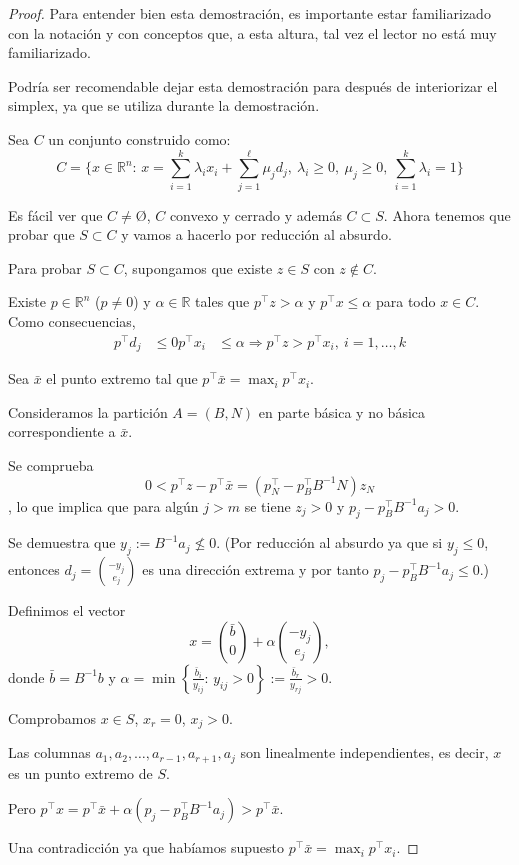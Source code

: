 \begin{proof}
Para entender bien esta demostración, es importante estar familiarizado con la notación y con conceptos que, a esta altura, tal vez el lector no está muy familiarizado. 

Podría ser recomendable dejar esta demostración para después de interiorizar el simplex, ya que se utiliza durante la demostración.


Sea $C$ un conjunto construido como:
\[
C = \{x\in\mathbb{R}^n:\, x = \sum_{i=1}^k \lambda_i x_i + \sum_{j=1}^\ell
 \mu_j d_j,\ \lambda_i\geq 0,\ \mu_j\geq 0,\ \sum_{i=1}^k \lambda_i=1\}
\]

Es fácil ver que $C≠Ø$, $C$ convexo y cerrado y además $C\subset S$.
Ahora tenemos que probar que $S\subset C$ y vamos a hacerlo por reducción al absurdo.

Para probar $S\subset C$, supongamos que existe $z\in S$ con $z\notin C$.

Existe $p\in\mathbb{R}^n$ ($p\neq 0$) y $\alpha \in\mathbb{R}$ tales que $p^\top z>\alpha$ y $p^\top x\leq \alpha$ para todo $x\in C$. 
Como consecuencias, 
\begin{align*}
p^\top d_j &\leq 0 
p^\top x_i &\leq \alpha \Rightarrow p^\top z > p^\top x_i,\ i=1,\ldots,k
\end{align*}

Sea $\bar{x}$ el punto extremo tal que $p^\top \bar{x} =\max_i p^\top x_i$.

Consideramos la partición $A=(B,N)$ en parte básica y no básica correspondiente  a $\bar{x}$.

Se comprueba \[0 < p^\top z- p^\top \bar{x}=(p_N^\top - p_B^\top B^{-1} N) z_N\], lo que implica que para algún $j>m$ se tiene $z_j>0$ y $p_j-p_B^\top B^{-1} a_j>0$.

Se demuestra  que $y_j:= B^{-1}a_j\nleq 0$. (Por reducción al absurdo ya que si $y_j\leq 0$, entonces $d_j= {-y_j\choose e_j}$ es una dirección extrema y por tanto $p_j-p_B^\top B^{-1}a_j\leq 0$.)


Definimos el vector
\[
x = {\bar{b}\choose 0} + \alpha {-y_j\choose e_j},
\]
donde $\bar{b} = B^{-1}b$ y $\alpha =\min\left\{\frac{\bar{b}_i}{y_{ij}}:\, y_{ij}>0 \right\}:= \frac{\bar{b}_r}{y_{rj}}>0$.


Comprobamos $x\in S$, $x_r=0$, $x_j>0$. 

Las columnas $a_1,a_2,\ldots,a_{r-1},a_{r+1},a_j$
son linealmente independientes, es decir, $x$ es un punto extremo de $S$.


Pero $p^\top x = p^\top \bar{x} + \alpha (p_j-p_B^\top B^{-1}a_j)> p^\top \bar{x}$.

Una contradicción ya que habíamos supuesto $p^\top \bar{x} =\max_i p^\top x_i$.

\end{proof}




